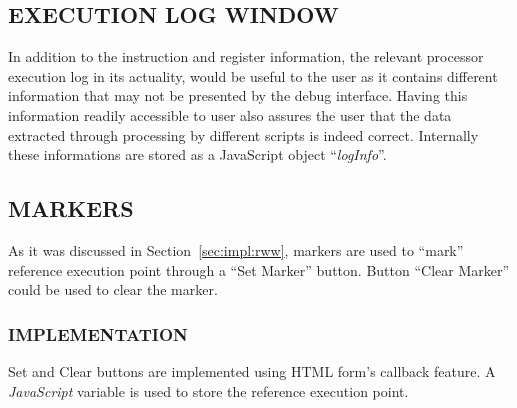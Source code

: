 \subsection {EXECUTION LOG WINDOW}

In addition to the instruction and register information, the relevant processor execution log in its actuality, would be useful to the user as it contains different information that may not be presented by the debug interface. Having this information readily accessible to user also assures the user that the data extracted through processing by different scripts is indeed correct. Internally these informations are stored as a JavaScript object ``{\it logInfo}''.


\subsection{MARKERS}
As it was discussed in Section~\ref{sec:impl:rww}, markers are used to ``mark'' reference execution point through a ``Set Marker'' button. Button ``Clear Marker'' could  be used to clear the marker.

\subsubsection{IMPLEMENTATION}

Set and Clear buttons are implemented using HTML form's callback feature. A {\it JavaScript} variable is used to store the reference execution point.


